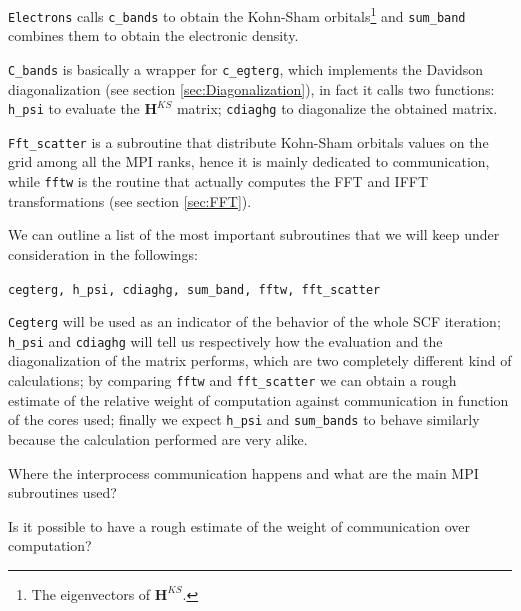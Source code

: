 \documentclass[a4paper,12pt]{article}
\newcommand\mf[1]{\mathbf{#1}}
\begin{document}
\texttt{Electrons} calls \texttt{c\_bands} to obtain the Kohn-Sham orbitals\footnote{The eigenvectors of $\mf{H}^{KS}$.} and \texttt{sum\_band} combines them to obtain the electronic density.

\texttt{C\_bands} is basically a wrapper for \texttt{c\_egterg}, which implements the Davidson diagonalization (see section \ref{sec:Diagonalization}), in fact it calls two functions:
\texttt{h\_psi} to evaluate the $\mf{H}^{KS}$ matrix; \texttt{cdiaghg} to diagonalize the obtained matrix.

\texttt{Fft\_scatter} is a subroutine that distribute Kohn-Sham orbitals values on the grid among all the MPI ranks, hence it is mainly dedicated to communication, while \texttt{fftw} is the routine that actually computes the FFT and IFFT transformations (see section \ref{sec:FFT}).

We can outline a list of the most important subroutines that we will keep under consideration in the followings:

\begin{center}
\texttt{cegterg, h\_psi, cdiaghg, sum\_band, fftw, fft\_scatter}
\end{center}

\texttt{Cegterg} will be used as an indicator of the behavior of the whole SCF iteration;
\texttt{h\_psi} and \texttt{cdiaghg} will tell us respectively how the evaluation and the diagonalization of the matrix performs, which are two completely different kind of calculations;
by comparing \texttt{fftw} and \texttt{fft\_scatter} we can obtain a rough estimate of the relative weight of computation against communication in function of the cores used; 
finally we expect \texttt{h\_psi} and \texttt{sum\_bands} to behave similarly because the calculation performed are very alike.





\newpage
\begin{center}
\begin{framed}
Where the interprocess communication happens and what are the main MPI subroutines used? 

Is it possible to have a rough estimate of the weight of communication over computation?
\end{framed}
\end{center}
\end{document}
